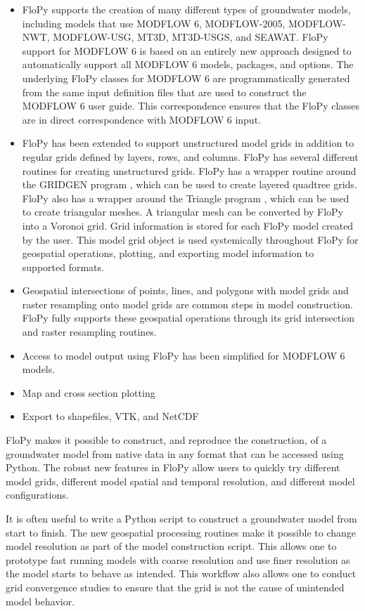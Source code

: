 \documentclass[11pt, oneside]{article}  	%
\begin{document}
\begin{itemize}
\item FloPy supports the creation of many different types of groundwater models, including models that use MODFLOW 6, MODFLOW-2005, MODFLOW-NWT, MODFLOW-USG, MT3D, MT3D-USGS, and SEAWAT. FloPy support for MODFLOW 6 is based on an entirely new approach designed to automatically support all MODFLOW 6 models, packages, and options. The underlying FloPy classes for MODFLOW 6 are programmatically generated from the same input definition files that are used to construct the MODFLOW 6 user guide. This correspondence ensures that the FloPy classes are in direct correspondence with MODFLOW 6 input.
\item FloPy has been extended to support unstructured model grids in addition to regular grids defined by layers, rows, and columns. FloPy has several different routines for creating unstructured grids. FloPy has a wrapper routine around the GRIDGEN program \citep{gridgen}, which can be used to create layered quadtree grids. FloPy also has a wrapper around the Triangle program \citep{trianglemesh}, which can be used to create triangular meshes. A triangular mesh can be converted by FloPy into a Voronoi grid. Grid information is stored for each FloPy model created by the user. This model grid object is used systemically throughout FloPy for geospatial operations, plotting, and exporting model information to supported formats.
\item Geospatial intersections of points, lines, and polygons with model grids and raster resampling onto model grids are common steps in model construction. FloPy fully supports these geospatial operations through its grid intersection and raster resampling routines.
\item Access to model output using FloPy has been simplified for MODFLOW 6 models. 
\item Map and cross section plotting
\item Export to shapefiles, VTK, and NetCDF
\end{itemize}

FloPy makes it possible to construct, and reproduce the construction, of a groundwater model from native data in any format that can be accessed using Python. The robust new features in FloPy allow users to quickly try different model grids, different model spatial and temporal resolution, and different model configurations. 

It is often useful to write a Python script to construct a groundwater model from start to finish. The new geospatial processing routines make it possible to change model resolution as part of the model construction script. This allows one to prototype fast running models with coarse resolution and use finer resolution as the model starts to behave as intended. This workflow also allows one to conduct grid convergence studies to ensure that the grid is not the cause of unintended model behavior.
\end{document}
